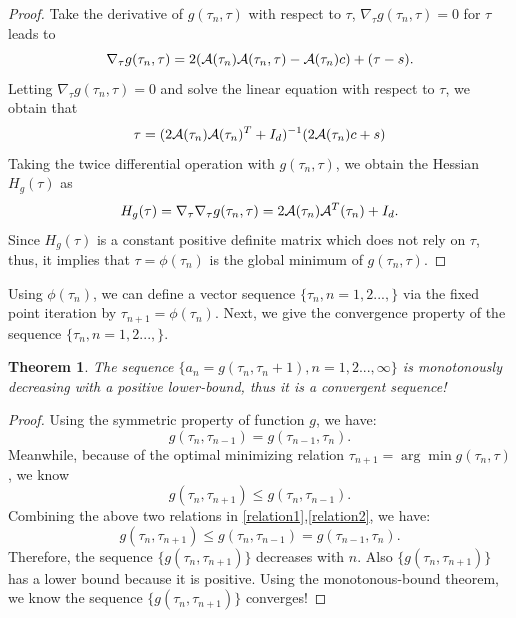 \documentclass[aos,preprint]{imsart}
\newtheorem{theorem}{Theorem}[section]
\theoremstyle{remark}
\begin{document}
\begin{proof}
Take the derivative of $g(\tau_n,\tau)$ with respect to $\tau$, $\nabla_\tau g(\tau_n, \tau)=0$ for $\tau$ leads to
\[
\nabla_\tau g(\tau_n, \tau) = 2({\cal A}(\tau_n){\cal A}(\tau_n,\tau)-{\cal A}(\tau_n)c) +(\tau-s).
\]
Letting $\nabla_\tau g(\tau_n, \tau)=0$ and solve the linear equation with respect to $\tau$, we obtain that 
\[
\tau = ( 2{\cal A}(\tau_{n}){\cal A}(\tau_{n})^T+ I_d)^{-1} (2{\cal A}(\tau_{n})c+ s)
\]
Taking the twice differential operation with $g(\tau_n, \tau) $, we obtain the Hessian $H_g(\tau)$ as 
\[
H_g(\tau) = \nabla_\tau \nabla_\tau g(\tau_n,\tau) = 2{\cal A}(\tau_n){\cal A}^T(\tau_n)+I_d.
\]
Since $H_g(\tau)$ is a constant positive definite matrix which does not rely on $\tau$, thus, it implies that $\tau = \phi(\tau_{n})$ is the global minimum of $g(\tau_n,\tau)$. 
\end{proof}
Using $\phi(\tau_n)$, we can define a vector sequence $\{\tau_n, n = 1,2...,\}$ via the fixed point iteration by
$
\tau_{n+1} = \phi(\tau_n).
$
Next, we give the convergence property of the sequence $\{\tau_n, n = 1,2...,\}$.
\begin{theorem}\label{convergence}
The sequence $\{a_n = g(\tau_n,\tau_n+1), n=1,2...,\infty\}$ is monotonously decreasing with a positive lower-bound, thus it is a convergent sequence!  
\end{theorem}
\begin{proof}
Using the symmetric property of function $g$, we have:
\begin{equation}\label{relation1}
g(\tau_{n},\tau_{n-1})= g(\tau_{n-1},\tau_n).
\end{equation}
 Meanwhile, because of the optimal minimizing relation $\tau_{n+1}=\arg\min g(\tau_{n},\tau)$, we know
 \begin{equation}\label{relation2}
 g(\tau_{n},\tau_{n+1}) \leq  g(\tau_{n},\tau_{n-1}).
 \end{equation}
Combining the above two relations in \eqref{relation1},\eqref{relation2}, we have:
\[
g(\tau_{n},\tau_{n+1}) \leq g(\tau_{n},\tau_{n-1})= g(\tau_{n-1},\tau_n). %
\]
Therefore, the sequence $\{g(\tau_{n},\tau_{n+1})\}$ decreases with $n$. Also $\{g(\tau_{n},\tau_{n+1})\}$ has a lower bound because it is positive. Using the monotonous-bound theorem, we know the sequence $\{g(\tau_{n},\tau_{n+1})\}$ converges!
\end{proof}
\end{document}

